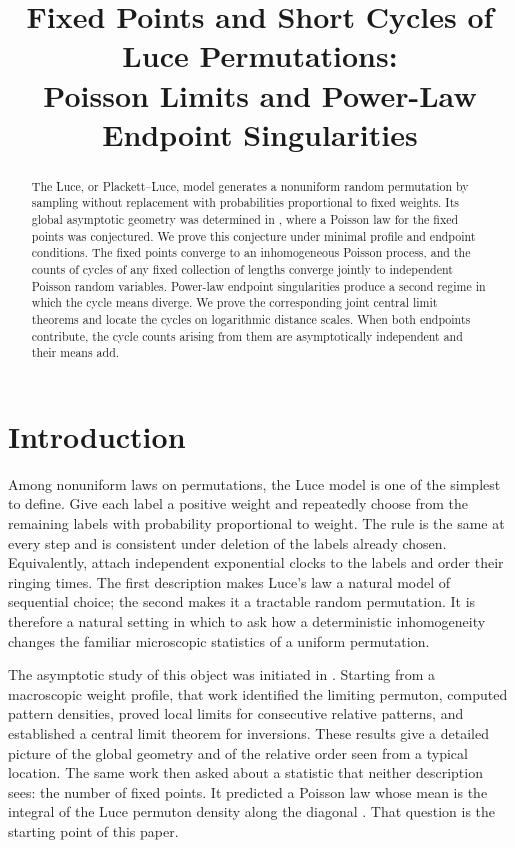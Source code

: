 \documentclass[11pt]{article}
\title{Fixed Points and Short Cycles of Luce Permutations:\\
Poisson Limits and Power-Law Endpoint Singularities}
\author{}
\date{}
\theoremstyle{remark}
\theoremstyle{plain}
\begin{document}
\maketitle

\begin{abstract}
The Luce, or Plackett--Luce, model generates a nonuniform random permutation
by sampling without replacement with probabilities proportional to fixed
weights.  Its global asymptotic geometry was determined in
\cite{borga2025permutonlocallimitsluce}, where a Poisson law for the fixed
points was conjectured.  We prove this conjecture under minimal profile and
endpoint conditions.  The fixed points converge to an inhomogeneous Poisson
process, and the counts of cycles of any fixed collection of lengths converge
jointly to independent Poisson random variables.  Power-law endpoint
singularities produce a second regime in which the cycle means diverge.  We
prove the corresponding joint central limit theorems and locate the cycles on
logarithmic distance scales.  When both endpoints contribute, the cycle
counts arising from them are asymptotically independent and their means add.
\end{abstract}

\tableofcontents
\clearpage

\section{Introduction}

Among nonuniform laws on permutations, the Luce model is one of the simplest
to define.  Give each label a positive weight and repeatedly choose from the
remaining labels with probability proportional to weight.  The rule is the
same at every step and is consistent under deletion of the labels already
chosen.  Equivalently, attach independent exponential clocks to the labels
and order their ringing times.  The first description makes Luce's law a
natural model of sequential choice; the second makes it a tractable random
permutation.  It is therefore a natural setting in which to ask how a
deterministic inhomogeneity changes the familiar microscopic statistics of a
uniform permutation.

The asymptotic study of this object was initiated in
\cite{borga2025permutonlocallimitsluce}.  Starting from a macroscopic weight
profile, that work identified the limiting permuton, computed pattern
densities, proved local limits for consecutive relative patterns, and
established a central limit theorem for inversions.  These results give a
detailed picture of the global geometry and of the relative order seen from a
typical location.  The same work then asked about a statistic that neither
description sees: the number of fixed points.  It predicted a Poisson law
whose mean is the integral of the Luce permuton density along the diagonal
\cite[Section~5.2]{borga2025permutonlocallimitsluce}.  That question is the
starting point of this paper.
\end{document}
